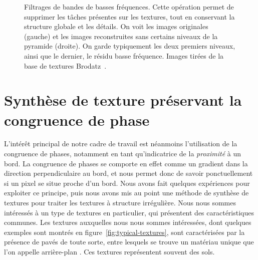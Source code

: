 \begin{figure}
    \caption[Filtrage de bandes de basses fréquences]{Filtrages de bandes de basses fréquences. Cette opération permet de supprimer les tâches présentes sur les textures, tout en conservant la structure globale et les détails. On voit les images originales (gauche) et les images reconstruites sans certains niveaux de la pyramide (droite). On garde typiquement les deux premiers niveaux, ainsi que le dernier, le résidu basse fréquence. Images tirées de la base de textures Brodatz~\cite{abdelmounaime_new_2013}.}
    \label{fig:filter-low-freq}
\end{figure}

\section{Synthèse de texture préservant la congruence de phase}

L'intérêt principal de notre cadre de travail est néanmoins l'utilisation de la congruence de phases, notamment en tant qu'indicatrice de la \textit{proximité} à un bord. La congruence de phases se comporte en effet comme un gradient dans la direction perpendiculaire au bord, et nous permet donc de savoir ponctuellement si un pixel se situe proche d'un bord. Nous avons fait quelques expériences pour exploiter ce principe, puis nous avons mis au point une méthode de synthèse de textures pour traiter les textures à structure irrégulière. Nous nous sommes intéressés à un type de textures en particulier, qui présentent des caractéristiques communes. Les textures auxquelles nous nous sommes intéressées, dont quelques exemples sont montrés en figure~\ref{fig:typical-textures}, sont caractérisées par la présence de pavés de toute sorte, entre lesquels se trouve un matériau unique que l'on appelle \og arrière-plan \fg. Ces textures représentent souvent des sols.

\bigskip

